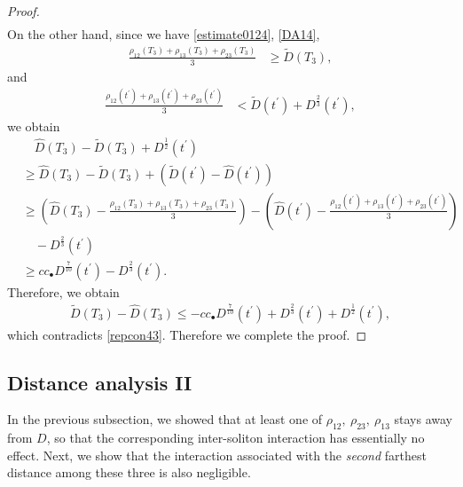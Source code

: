 \documentclass[reqno]{amsart}
\theoremstyle{plain}
\theoremstyle{definition}
\numberwithin{equation}{section}
\newcommand{\1}{\mathbbm{1}}
\begin{document}
\begin{proof}
\begin{align}
\end{align}
On the other hand, since we have \eqref{estimate0124}, \eqref{DA14},
\begin{align*}
\frac{\rho_{12}(T_3)+\rho_{13}(T_3)+\rho_{23}(T_3)}{3}&\geq \tilde{D}(T_3),
\end{align*}
and
\begin{align*}
\frac{\rho_{12}(t^{\prime})+\rho_{13}(t^{\prime})+\rho_{23}(t^{\prime})}{3}&<\tilde{D}(t^{\prime})+D^{\frac{2}{3}}(t^{\prime}),
\end{align*}
we obtain
\begin{align*}
&\quad \hat{D}(T_3)-\tilde{D}(T_3)+D^{\frac{1}{2}}(t^{\prime})
\\
&\geq \hat{D}(T_3)-\tilde{D}(T_3)+\left( \tilde{D}(t^{\prime})-\hat{D}(t^{\prime})\right)
\\
&\geq \left(\hat{D}(T_3)-\frac{\rho_{12}(T_3)+\rho_{13}(T_3)+\rho_{23}(T_3)}{3}\right)-\left(\hat{D}(t^{\prime})-\frac{\rho_{12}(t^{\prime})+\rho_{13}(t^{\prime})+\rho_{23}(t^{\prime})}{3}\right)
\\
&\quad -D^{\frac{2}{3}}(t^{\prime})
\\
&\geq cc_{\bullet}D^{\frac{7}{10}}(t^{\prime})-D^{\frac{2}{3}}(t^{\prime}).
\end{align*}
Therefore, we obtain
\begin{align*}
\tilde{D}(T_3)-\hat{D}(T_3)\leq -cc_{\bullet}D^{\frac{7}{10}}(t^{\prime})+D^{\frac{2}{3}}(t^{\prime})+D^{\frac{1}{2}}(t^{\prime}),
\end{align*}
which contradicts \eqref{repcon43}. Therefore we complete the proof.

\end{proof}




\subsection{Distance analysis II}

In the previous subsection, we showed that at least one of $\rho_{12},\ \rho_{23},\ \rho_{13}$ stays away from $D$, so that the corresponding inter-soliton interaction has essentially no effect.
Next, we show that the interaction associated with the \emph{second} farthest distance among these three is also negligible.
\end{document}
